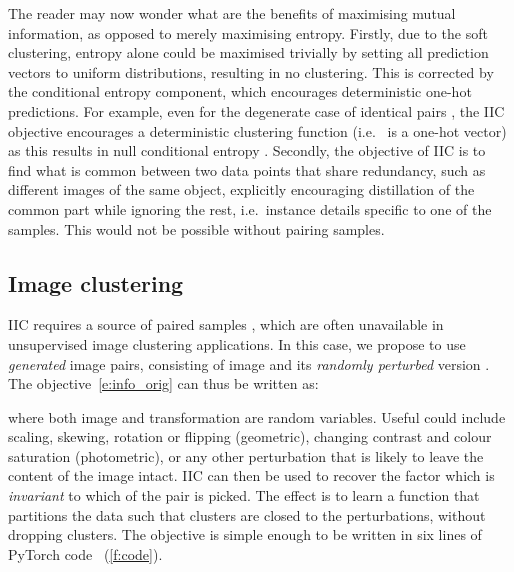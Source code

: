 \documentclass[10pt,twocolumn,letterpaper]{article}
\newcommand{\methodnameshort}{IIC\xspace}
\begin{document}
The reader may now wonder what are the benefits of maximising mutual information, as opposed to merely maximising entropy.
Firstly, due to the soft clustering, entropy alone could be maximised trivially by setting all prediction vectors  to uniform distributions, resulting in no clustering.
This is corrected by the conditional entropy component, which encourages deterministic one-hot predictions.
For example, even for the degenerate case of identical pairs , the \methodnameshort objective encourages a deterministic clustering function (i.e.~ is a one-hot vector) as this results in null conditional entropy . 
Secondly, the objective of \methodnameshort is to find what is common between two data points that share redundancy, such as different images of the same object, explicitly encouraging distillation of the common part while ignoring the rest, i.e.~instance details specific to one of the samples. This would not be possible without pairing samples.





\subsection{Image clustering}\label{s:image_clustering}

\methodnameshort requires a source of paired samples , which are often unavailable in unsupervised image clustering applications. In this case, we propose to use \emph{generated} image pairs, consisting of image  and its \emph{randomly perturbed} version . The objective~\cref{e:info_orig} can thus be written as:

where both image  and transformation  are random variables.
Useful  could include scaling, skewing, rotation or flipping (geometric), changing contrast and colour saturation (photometric), or any other perturbation that is likely to leave the content of the image intact.
\methodnameshort can then be used to recover the factor which is \emph{invariant} to which of the pair is picked. 
The effect is to learn a function that partitions the data such that clusters are closed to the perturbations, without dropping clusters. 
The objective is simple enough to be written in six lines of PyTorch code ~(\cref{f:code}).


\end{document}
